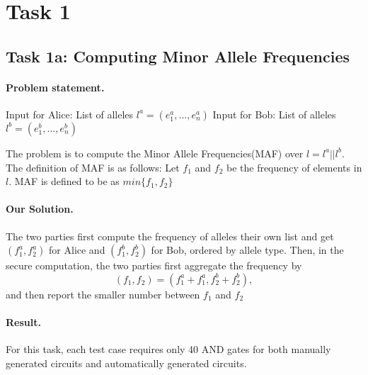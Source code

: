 \section{Task 1}
\subsection*{Task 1a: Computing Minor Allele Frequencies}
\paragraph{Problem statement.}
Input for Alice: List of alleles $l^a = (e^a_1,...,e^a_n)$
Input for Bob: List of alleles $l^b = (e^b_1,...,e^b_n)$

The problem is to compute the 
Minor Allele Frequencies(MAF) over $l = l^a || l^b$. The definition of MAF is as follows:
Let $f_1$ and $f_2$ be the frequency of elements in $l$. MAF is defined to be as $min\{f_1, f_2\}$

\paragraph{Our Solution.}
The two parties first compute the frequency of alleles their own list and get
$(f^a_1, f^a_2)$ for Alice and $(f^b_1,f^b_2)$ for Bob, ordered by allele type.
Then, in the secure computation, the two parties first aggregate the frequency by
$$(f_1, f_2) = (f^a_1+f^a_1, f^b_2+f^b_2),$$
and then report the smaller number between $f_1$ and $f_2$
\paragraph{Result.}
For this task, each test case requires only 40 AND gates for both manually generated circuits and automatically generated circuits.

